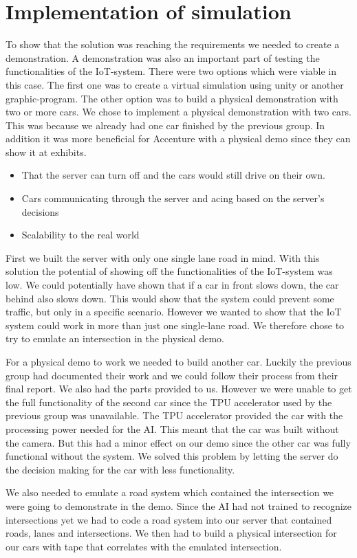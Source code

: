 \section{Implementation of simulation}
To show that the solution was reaching the requirements we needed to create a demonstration. A demonstration was also an important part of testing the functionalities of the IoT-system. There were two options which were viable in this case. The first one was to create a virtual simulation using unity or another graphic-program. The other option was to build a physical demonstration with two or more cars. We chose to implement a physical demonstration with two cars. This was because we already had one car finished by the previous group. In addition it was more beneficial for Accenture with a physical demo since they can show it at exhibits.
\begin{itemize}
	\item That the server can turn off and the cars would still drive on their own.
	\item Cars communicating through the server and acing based on the server’s decisions
	\item Scalability to the real world
\end{itemize}
First we built the server with only one single lane road in mind. With this solution the potential of showing off the functionalities of the IoT-system was low. We could potentially have shown that if a car in front slows down, the car behind also slows down. This would show that the system could prevent some traffic, but only in a specific scenario. However we wanted to show that the IoT system could work in more than just one single-lane road. We therefore chose to try to emulate an intersection in the physical demo.

For a physical demo to work we needed to build another car. Luckily the previous group had documented their work and we could follow their process from their final report. We also had the parts provided to us. However we were unable to get the full functionality of the second car since the TPU accelerator used by the previous group was unavailable. The TPU accelerator provided the car with the processing power needed for the AI. This meant that the car was built without the camera. But this had a minor effect on our demo since the other car was fully functional without the system. We solved this problem by letting the server do the decision making for the car with less functionality.

We also needed to emulate a road system which contained the intersection we were going to demonstrate in the demo. Since the AI had not trained to recognize intersections yet we had to code a road system into our server that contained roads, lanes and intersections. We then had to build a physical intersection for our cars with tape that correlates with the emulated intersection. 

